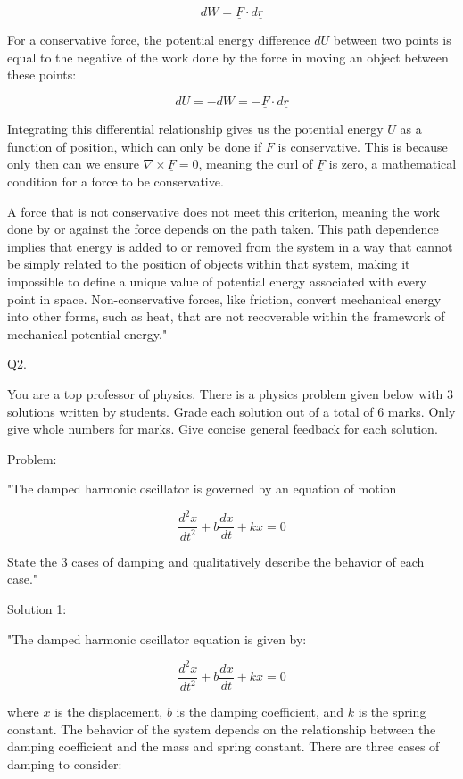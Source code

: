 \[ dW = \underline{F} \cdot d\underline{r} \]

For a conservative force, the potential energy difference \( dU \) between two points is equal to the negative of the work done by the force in moving an object between these points:

\[ dU = -dW = -\underline{F} \cdot d\underline{r} \]

Integrating this differential relationship gives us the potential energy \( U \) as a function of position, which can only be done if \( \underline{F} \) is conservative. This is because only then can we ensure \( \nabla \times \underline{F} = 0 \), meaning the curl of \( \underline{F} \) is zero, a mathematical condition for a force to be conservative.

A force that is not conservative does not meet this criterion, meaning the work done by or against the force depends on the path taken. This path dependence implies that energy is added to or removed from the system in a way that cannot be simply related to the position of objects within that system, making it impossible to define a unique value of potential energy associated with every point in space. Non-conservative forces, like friction, convert mechanical energy into other forms, such as heat, that are not recoverable within the framework of mechanical potential energy."



                           Q2. 

You are a top professor of physics. There is a physics problem given below with 3 solutions written by students. Grade each solution out of a total of 6 marks. Only give whole numbers for marks. Give concise general feedback for each solution.

Problem: 

"The damped harmonic oscillator is governed by an equation of motion

\[
\frac{d^{2}x}{dt^{2}} + b\frac{dx}{dt}+kx=0
\]

State the 3 cases of damping and qualitatively describe the behavior of each case."

Solution 1:

"The damped harmonic oscillator equation is given by:

\[
\frac{d^{2}x}{dt^{2}} + b\frac{dx}{dt}+kx=0
\]

where \(x\) is the displacement, \(b\) is the damping coefficient, and \(k\) is the spring constant. The behavior of the system depends on the relationship between the damping coefficient and the mass and spring constant. There are three cases of damping to consider:

